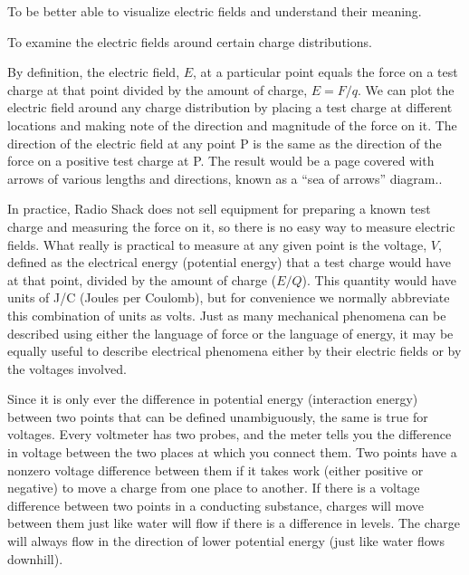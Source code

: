 \label{lab:e-field}

\apparatus
{}

\begin{goals}

\item[] To be better able to visualize electric fields and
understand their meaning.

\item[] To examine the electric fields around certain charge distributions.
\end{goals}

\introduction

By definition, the electric field, $E$, at a particular
point equals the force on a test charge at that point
divided by the amount of charge, $E=F/q$. We can plot the electric
field around any charge distribution by placing a test
charge at different locations and making note of the
direction and magnitude of the force on it. The direction of
the electric field at any point P is the same as the
direction of the force on a positive test charge at P. The
result would be a page covered with arrows of various
lengths and directions, known as a ``sea of arrows'' diagram..

In practice, Radio Shack does not sell equipment for
preparing a known test charge and measuring the force on it,
so there is no easy way to measure electric fields. What
really is practical to measure at any given point is the
voltage, $V$, defined as the electrical  energy (potential energy) that a test
charge would have at that point, divided by the amount of
charge ($E/Q$). This quantity would have units of J/C (Joules per
Coulomb), but for convenience we normally abbreviate this
combination of units as volts. Just as many mechanical
phenomena can be described using either the language of
force or the language of energy, it may be equally useful to
describe electrical phenomena either by their electric
fields or by the voltages involved.

Since it is only ever the difference in potential energy (interaction energy)
between two points that can be defined unambiguously, the
same is true for voltages. Every voltmeter has two probes,
and the meter tells you the difference in voltage between
the two places at which you connect them. Two points have a
nonzero voltage difference between them if it takes work (either positive or negative) to
move a charge from one place to another.
If there is a voltage difference between two points in
a conducting substance, charges will move between them just like water will
flow if there is a difference in levels. The charge will
always flow in the direction of lower potential energy (just
like water flows downhill). 

